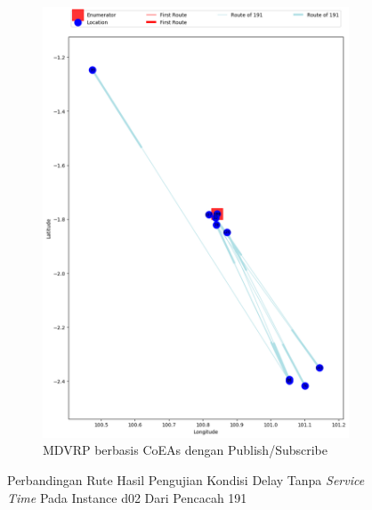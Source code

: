 \begin{figure}[H]\ContinuedFloat
	\centering
	\begin{subfigure}[t]{\textwidth}
		\centering
		\includegraphics[width=\textwidth]{Resources/Images/delayed_2/real_m15_n100_delayed_2_191_pubsub_coes}
		\caption{MDVRP berbasis CoEAs dengan Publish/Subscribe}
		\label{fig:real_m15_n100_delayed_2_191_pubsub_coes}
	\end{subfigure}
	\caption{Perbandingan Rute Hasil Pengujian Kondisi Delay Tanpa \textit{Service Time} Pada Instance d02 Dari Pencacah 191}
	\label{fig:real_m15_n100_delayed_2_191_contd}
\end{figure}


